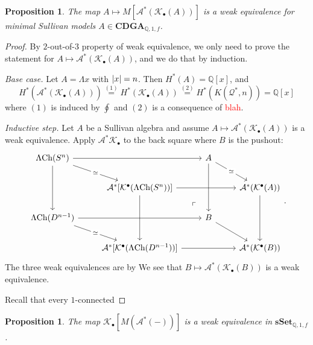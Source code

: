 \documentclass[psamsfonts]{amsart}
\newtheorem{prop}[thm]{Proposition}
\theoremstyle{definition}
\theoremstyle{remark}
\newcommand{\Q}{\mathbb{Q}}
\newcommand{\CDGA}{\mathbf{CDGA}}
\newcommand{\ch}{\textup{Ch}}
\newcommand{\sSet}{\mathbf{sSet}}
\numberwithin{equation}{section}
\begin{document}
\begin{prop}
The map $A\mapsto M[\mathcal{A}^\ast(\mathcal{K}_\bullet(A))]$ is a weak equivalence for minimal Sullivan models $A\in\CDGA_{\Q,1,f}$.  
\end{prop}
\begin{proof}
By $2$-out-of-$3$ property of weak equivalence, we only need to prove the statement for $A\mapsto\mathcal{A}^\ast(\mathcal{K}_\bullet(A))$, and we do that by induction.\medbreak

\textit{Base case.} Let $A=\Lambda x$ with $\abs{x}=n$. Then $H^\ast(A)=\Q[x]$, and
\[H^\ast(\mathcal{A}^\ast(\mathcal{K}_\bullet(A)))\stackrel{(1)}{=}H^\ast(\mathcal{K}_\bullet(A))\stackrel{(2)}{=}H^\ast(K(\mathcal{Q}^\ast,n))=\Q[x]\]
where $(1)$ is induced by $\oint$ and $(2)$ is a consequence of \textcolor{red}{blah}.\medbreak

\textit{Inductive step.} Let $A$ be a Sullivan algebra and assume $A\mapsto\mathcal{A}^\ast(\mathcal{K}_\bullet(A))$ is a weak equivalence.
Apply $\mathcal{A}^\ast\mathcal{K}_\bullet$ to the back square where $B$ is the pushout:
\[\begin{tikzcd}
	{\Lambda\ch(S^n)} && A\arrow[dd,phantom,"\ulcorner",very near end, shift right=4ex] \\
	& {\mathcal{A}^\ast[\mathcal{K}^\bullet(\Lambda\ch(S^n))]} && {\mathcal{A}^\ast(\mathcal{K}^\bullet(A))} \\
	{\Lambda\ch(D^{n-1})} && B \\
	& {\mathcal{A}^\ast[\mathcal{K}^\bullet(\Lambda\ch(D^{n-1}))]} && {\mathcal{A}^\ast(\mathcal{K}^\bullet(B))}
	\arrow["\simeq"{description}, from=1-1, to=2-2]
	\arrow[from=1-1, to=1-3]
	\arrow[from=2-2,crossing over, to=2-4]
	\arrow["\simeq"{description}, from=1-3, to=2-4]
	\arrow[from=1-1, to=3-1]
	\arrow[from=2-2,crossing over, to=4-2]
	\arrow["\simeq"{description}, from=3-1, to=4-2]
	\arrow[from=2-4, to=4-4]
	\arrow[from=3-1, to=3-3]
	\arrow[from=1-3, to=3-3]
	\arrow[from=3-3, to=4-4]
	\arrow[from=4-2, to=4-4]
\end{tikzcd}.\]
The three weak equivalences are by 
We see that $B\mapsto\mathcal{A}^\ast(\mathcal{K}_\bullet(B))$ is a weak equivalence.

Recall that every $1$-connected
\end{proof}

\begin{prop}
The map $\mathcal{K}_\bullet[M(\mathcal{A}^\ast(-))]$ is a weak equivalence in ${\sSet_{\Q,1,f}}$.
\end{prop}
\end{document}
